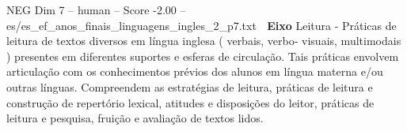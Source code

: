 \begin{textsample}{NEG Dim 7 – human – Score -2.00 – es/es\_ef\_anos\_finais\_linguagens\_ingles\_2\_p7.txt}  \label{ex:f7_neg_003}
 \textbf{Eixo} Leitura - Práticas de leitura de textos diversos em língua inglesa ( verbais, verbo‐ visuais, multimodais ) presentes em diferentes suportes e esferas de circulação.
Tais práticas envolvem articulação com os conhecimentos prévios dos alunos em língua materna e/ou outras línguas.
Compreendem as estratégias de leitura, práticas de leitura e construção de repertório lexical, atitudes e disposições do leitor, práticas de leitura e pesquisa, fruição e avaliação de textos lidos.

\end{textsample}
